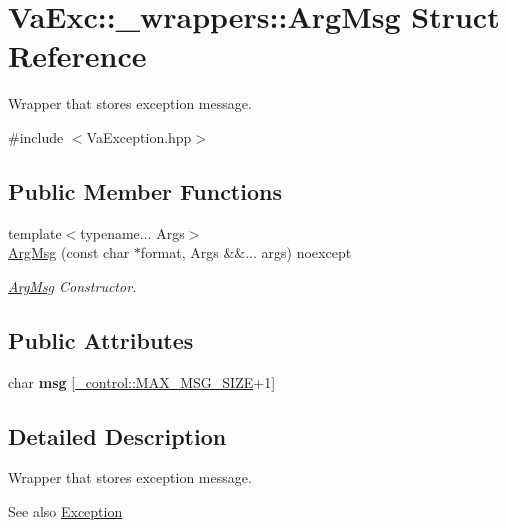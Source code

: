 \hypertarget{struct_va_exc_1_1__wrappers_1_1_arg_msg}{}\section{Va\+Exc\+:\+:\+\_\+wrappers\+:\+:Arg\+Msg Struct Reference}
\label{struct_va_exc_1_1__wrappers_1_1_arg_msg}


Wrapper that stores exception message.  




{\ttfamily \#include $<$Va\+Exception.\+hpp$>$}

\subsection*{Public Member Functions}
\begin{DoxyCompactItemize}
\item 
{\footnotesize template$<$typename... Args$>$ }\\\hyperlink{struct_va_exc_1_1__wrappers_1_1_arg_msg_ad7bb2c449c64e2ea7fb38cff28075705}{Arg\+Msg} (const char $\ast$format, Args \&\&... args) noexcept
\begin{DoxyCompactList}\small\item\em \hyperlink{struct_va_exc_1_1__wrappers_1_1_arg_msg}{Arg\+Msg} Constructor. \end{DoxyCompactList}\end{DoxyCompactItemize}
\subsection*{Public Attributes}
\begin{DoxyCompactItemize}
\item 
\mbox{\label{struct_va_exc_1_1__wrappers_1_1_arg_msg_a35ed90979f7e7d16fc3c9fd6f3f86de0}} 
char {\bfseries msg} \mbox{[}\hyperlink{namespace_va_exc_1_1__control_aad5ec6136f6195d13e0b307b0155f10e}{\+\_\+control\+::\+M\+A\+X\+\_\+\+M\+S\+G\+\_\+\+S\+I\+ZE}+1\mbox{]}
\end{DoxyCompactItemize}


\subsection{Detailed Description}
Wrapper that stores exception message. 

\begin{DoxySeeAlso}{See also}
\hyperlink{class_va_exc_1_1_exception}{Exception} 
 
\end{DoxySeeAlso}



